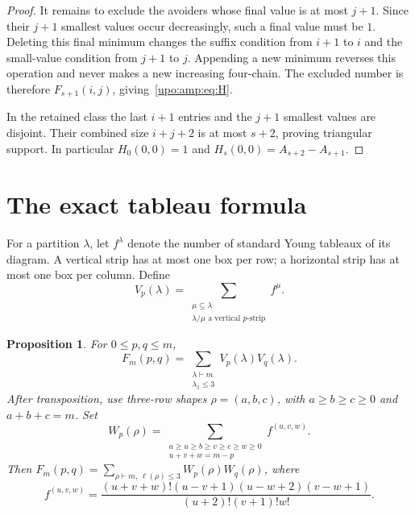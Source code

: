 \documentclass[11pt,letterpaper]{article}
\newtheorem{proposition}[theorem]{Proposition}
\theoremstyle{remark}\newtheorem{remark}[theorem]{Remark}
\numberwithin{equation}{section}
\begin{document}
\begin{proof}
It remains to exclude the avoiders whose final value is at most $j+1$.
Since their $j+1$ smallest values occur decreasingly, such a final value
must be $1$. Deleting this final minimum changes the suffix condition
from $i+1$ to $i$ and the small-value condition from $j+1$ to $j$.
Appending a new minimum reverses this operation and never makes a new
increasing four-chain. The excluded number is therefore $F_{s+1}(i,j)$,
giving~\eqref{upo:amp:eq:H}.

In the retained class the last $i+1$ entries and the $j+1$ smallest values
are disjoint. Their combined size $i+j+2$ is at most $s+2$, proving
triangular support. In particular $H_0(0,0)=1$ and
$H_s(0,0)=A_{s+2}-A_{s+1}$.
\end{proof}

\section{The exact tableau formula}\label{upo:amp:sec:tableaux}
For a partition $\lambda$, let $f^\lambda$ denote the number of standard
Young tableaux of its diagram. A vertical strip has at most one box per
row; a horizontal strip has at most one box per column. Define
\[
V_p(\lambda)=\sum_{\substack{\mu\subseteq\lambda\\
\lambda/\mu\text{ a vertical }p\text{-strip}}}f^\mu.
\]
\begin{proposition}\label{upo:amp:prop:F}
For $0\le p,q\le m$,
\begin{equation}\label{upo:amp:eq:F}
F_m(p,q)=\sum_{\substack{\lambda\vdash m\\\lambda_1\le3}}
V_p(\lambda)V_q(\lambda).
\end{equation}
After transposition, use three-row shapes $\rho=(a,b,c)$, with
$a\ge b\ge c\ge0$ and $a+b+c=m$. Set
\begin{equation}\label{upo:amp:eq:W}
W_p(\rho)=
\sum_{\substack{a\ge u\ge b\ge v\ge c\ge w\ge0\\u+v+w=m-p}}
f^{(u,v,w)}.
\end{equation}
Then $F_m(p,q)=\sum_{\rho\vdash m,\,\ell(\rho)\le3}W_p(\rho)W_q(\rho)$,
where
\begin{equation}\label{upo:amp:eq:hook}
f^{(u,v,w)}=
\frac{(u+v+w)!(u-v+1)(u-w+2)(v-w+1)}
{(u+2)!(v+1)!w!}.
\end{equation}
\end{proposition}
\end{document}
